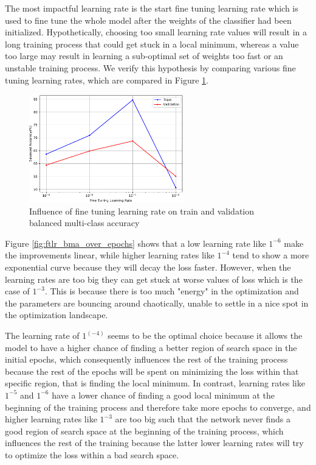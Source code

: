     The most impactful learning rate is the start fine tuning learning rate which is used to fine tune the whole model after the weights of the classifier had been initialized. Hypothetically, choosing too small learning rate values will result in a long training process that could get stuck in a local minimum, whereas a value too large may result in learning a sub-optimal set of weights too fast or an unstable training process. We verify this hypothesis by comparing various fine tuning learning rates, which are compared in Figure \ref{fig:ftlr_comp}. \par
    \begin{figure}[ht]
        \centering
        \includegraphics[width=0.6\textwidth]{figs/densenet201_ftlr_comp.pdf}
        \caption{Influence of fine tuning learning rate on train and validation balanced multi-class accuracy}
        \label{fig:ftlr_comp}
    \end{figure}
    
    Figure \ref{fig:ftlr_bma_over_epochs} shows that a low learning rate like $1^{-6}$ make the improvements  linear, while higher learning rates like $1^{-4}$ tend to show a more exponential curve because they will decay the loss faster. However, when the learning rates are too big they can get stuck at worse values of loss which is the case of $1^{-3}$. This is because there is too much "energy" in the optimization and the parameters are bouncing around chaotically, unable to settle in a nice spot in the optimization landscape. \par
    The learning rate of $1^(-4)$ seems to be the optimal choice because it allows the model to have a higher chance of finding a better region of search space in the initial epochs, which consequently influences the rest of the training process because the rest of the epochs will be spent on minimizing the loss within that specific region, that is finding the local minimum. In contrast, learning rates like $1^{-5}$ and $1^{-6}$ have a lower chance of finding a good local minimum at the beginning of the training process and therefore take more epochs to converge, and higher learning rates like $1^{-3}$ are too big such that the network never finds a good region of search space at the beginning of the training process, which influences the rest of the training because the latter lower learning rates will try to optimize the loss within a bad search space. \par
    
